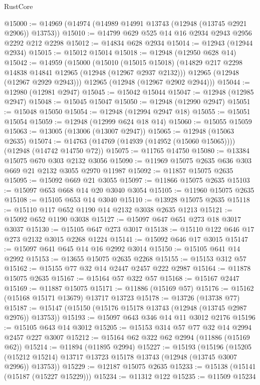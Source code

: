 \begin{lexlean}{RustCore}
\begin{coremodule}
@15000 := @14969 (@14974 (@14989 @14991 @13743 (@12948 (@13745 @2921 @2906)) @13753))
@15010 := @14799 @629 @525 @14 @16 @2934 @2943 @2956 @2292 @212 @2298
@15012 := @14834 @628 @2934
@15014 := @12943 (@12944 @2934)
@15015 := @15012 @15014
@15018 := @12948 (@12950 @628 @14)
@15042 := @14959
    (@15000
      (@15010
        (@15015 @15018)
        (@14829 @217 @2298 @14838 @14841 @12965 (@12948 (@12967 @2937 @2132)))
        @12965
        (@12948 (@12967 @2929 @2943)))
      @12965
      (@12948 (@12967 @2902 @2944)))
@15044 := @12980 (@12981 @2947)
@15045 := @15042 @15044
@15047 := @12948 (@12985 @2947)
@15048 := @15045 @15047
@15050 := @12948 (@12990 @2947)
@15051 := @15048 @15050
@15054 := @12948 (@12994 @2947 @18)
@15055 := @15051 @15054
@15059 := @12948 (@12999 @624 @18 @14)
@15060 := @15055 @15059
@15063 := @13005 (@13006 (@13007 @2947))
@15065 := @12948 (@15063 @2635)
@15074 := @14763 (@14769 (@14939 (@14952 (@15060 @15065)))) (@12948 (@14742 @14750 @72))
@15075 := @11765 @14750
@15080 := @13384 @15075 @670 @303 @2132 @3056
@15090 := @11969 @15075 @2635 @636 @303 @669 @21 @2132 @3055 @2970 @11987
@15092 := @11857 @15075 @2635
@15095 := @15092 @669 @21 @3055
@15097 := @11866 @15075 @2635
@15103 := @15097 @653 @668 @14 @20 @3040 @3054
@15105 := @11960 @15075 @2635
@15108 := @15105 @653 @14 @3040
@15110 := @13928 @15075 @2635
@15118 := @15110 @117 @652 @1190 @14 @2132 @3038 @2635 @1213
@15121 := @15092 @652 @1190 @3038
@15127 := @15097 @647 @651 @273 @18 @3017 @3037
@15130 := @15105 @647 @273 @3017
@15138 := @15110 @122 @646 @17 @273 @2132 @3015 @2268 @1224
@15141 := @15092 @646 @17 @3015
@15147 := @15097 @641 @645 @14 @16 @2992 @3014
@15150 := @15105 @641 @14 @2992
@15153 := @13655 @15075 @2635 @2268
@15155 := @15153 @312 @57
@15162 := @15155 @77 @32 @14 @2447 @2457 @222 @2987
@15164 := @11878 @15075 @2635
@15167 := @15164 @57 @322 @57
@15168 := @15167 @2447
@15169 := @11887 @15075
@15171 := @11886 (@15169 @57)
@15176 := @15162 (@15168 @15171 @13679) @13717 @13723
@15178 := @13726 (@13738 @77)
@15187 := @15147 (@15150 (@15176 @15178 @13743 (@12948 (@13745 @2987 @2976)) @13753))
@15193 := @15097 @643 @346 @14 @11 @3012 @2176
@15196 := @15105 @643 @14 @3012
@15205 := @15153 @314 @57 @77 @32 @14 @2994 @2457 @227 @3007
@15212 := @15164 @62 @322 @62 @2994 (@11886 (@15169 @62))
@15214 := @11894 (@11895 @2994)
@15227 := @15193
    (@15196
      (@15205 (@15212 @15214) @13717 @13723 @15178 @13743 (@12948 (@13745 @3007 @2996)) @13753))
@15229 := @12187 @15075 @2635
@15233 := @15138 (@15141 (@15187 (@15227 @15229)))
@15234 := @11312 @122
@15235 := @11509 @15234

\end{coremodule}
\end{lexlean}
